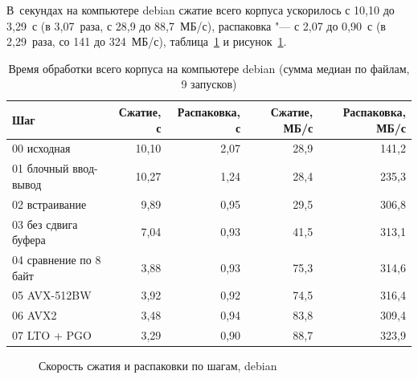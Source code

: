 
В~секундах на компьютере debian сжатие всего корпуса ускорилось с 10,10 до
3,29~с (в 3,07~раза, с 28,9 до 88,7~МБ/с), распаковка "--- с 2,07 до
0,90~с (в 2,29~раза, со 141 до 324~МБ/с), таблица~\ref{tab:wall} и
рисунок~\ref{fig:throughput}.

\begin{table}[H]
\caption{Время обработки всего корпуса на компьютере debian (сумма медиан по файлам, 9 запусков)}
\label{tab:wall}
\begin{tabletext}
\centering
\begin{tabular}{|l|r|r|r|r|}
\hline
\textbf{Шаг} & \textbf{Сжатие, с} & \textbf{Распаковка, с} & \textbf{Сжатие, МБ/с} & \textbf{Распаковка, МБ/с} \\
\hline
00 исходная & 10,10 & 2,07 & 28,9 & 141,2 \\
01 блочный ввод-вывод & 10,27 & 1,24 & 28,4 & 235,3 \\
02 встраивание & 9,89 & 0,95 & 29,5 & 306,8 \\
03 без сдвига буфера & 7,04 & 0,93 & 41,5 & 313,1 \\
04 сравнение по 8 байт & 3,88 & 0,93 & 75,3 & 314,6 \\
05 AVX-512BW & 3,92 & 0,92 & 74,5 & 316,4 \\
06 AVX2 & 3,48 & 0,94 & 83,8 & 309,4 \\
07 LTO + PGO & 3,29 & 0,90 & 88,7 & 323,9 \\
\hline
\end{tabular}
\end{tabletext}
\end{table}

\begin{figure}[H]
\centering
{}
\caption{Скорость сжатия и распаковки по шагам, debian}
\label{fig:throughput}
\end{figure}

